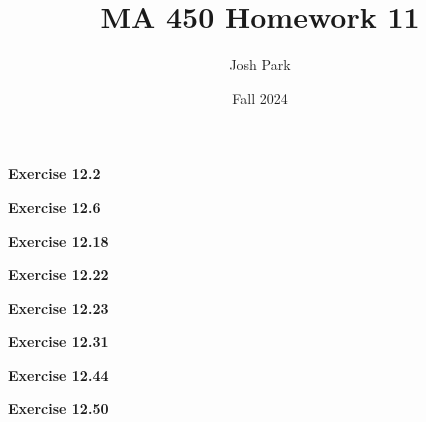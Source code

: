 \documentclass{article}
\author{Josh Park}
\date{\vspace*{-1em}Fall 2024}
\title{\vspace*{-2em}MA 450 Homework 11\vspace*{-1em}}
\begin{document}
\maketitle
\textbf{Exercise 12.2}
\newpage

\textbf{Exercise 12.6}
\newpage

\textbf{Exercise 12.18}
\newpage

\textbf{Exercise 12.22}
\newpage

\textbf{Exercise 12.23}
\newpage

\textbf{Exercise 12.31}
\newpage

\textbf{Exercise 12.44}
\newpage

\textbf{Exercise 12.50}
\newpage
\end{document}
